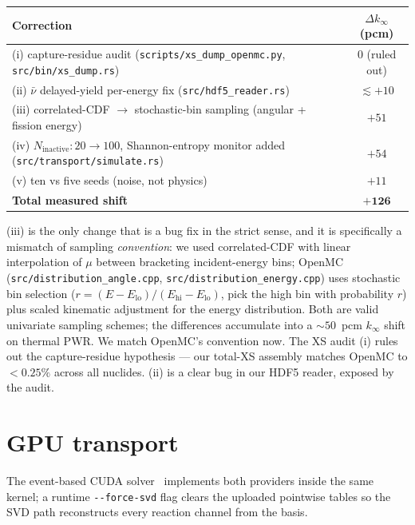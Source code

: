 \documentclass[11pt,a4paper]{article}
\begin{document}
\begin{center}
\begin{tabular}{@{}lc@{}}
\toprule
Correction & $\Delta k_\infty$ (pcm) \\
\midrule
(i) capture-residue audit (\texttt{scripts/xs\_dump\_openmc.py},
\texttt{src/bin/xs\_dump.rs}) & \phantom{+}$0$ (ruled out) \\
(ii) $\bar\nu$ delayed-yield per-energy fix
(\texttt{src/hdf5\_reader.rs}) & $\lesssim +10$ \\
(iii) correlated-CDF $\rightarrow$ stochastic-bin sampling
(angular + fission energy) & $+51$ \\
(iv) $N_\text{inactive}: 20 \rightarrow 100$, Shannon-entropy
monitor added
(\texttt{src/transport/simulate.rs}) & $+54$ \\
(v) ten vs five seeds (noise, not physics) & $+11$ \\
\midrule
\textbf{Total measured shift} & $\mathbf{+126}$ \\
\bottomrule
\end{tabular}
\end{center}

(iii) is the only change that is a bug fix in the strict
sense, and it is specifically a mismatch of sampling
\emph{convention}: we used correlated-CDF with linear
interpolation of $\mu$ between bracketing incident-energy
bins; OpenMC
(\texttt{src/distribution\_angle.cpp},
\texttt{src/distribution\_energy.cpp}) uses stochastic bin
selection ($r = (E - E_\text{lo})/(E_\text{hi}-E_\text{lo})$,
pick the high bin with probability $r$) plus scaled kinematic
adjustment for the energy distribution. Both are valid
univariate sampling schemes; the differences accumulate into
a $\sim\!50$~pcm $k_\infty$ shift on thermal PWR. We match
OpenMC's convention now. The XS audit (i) rules out the
capture-residue hypothesis --- our total-XS assembly matches
OpenMC to $<\!0.25\%$ across all nuclides. (ii) is a clear
bug in our HDF5 reader, exposed by the audit.

\section{GPU transport}
\label{sec:gpu}

The event-based CUDA solver~\cite{tramm2024} implements both
providers inside the same kernel; a runtime
\texttt{-{}-force-svd} flag clears the uploaded pointwise
tables so the SVD path reconstructs every reaction channel
from the basis.
\end{document}
